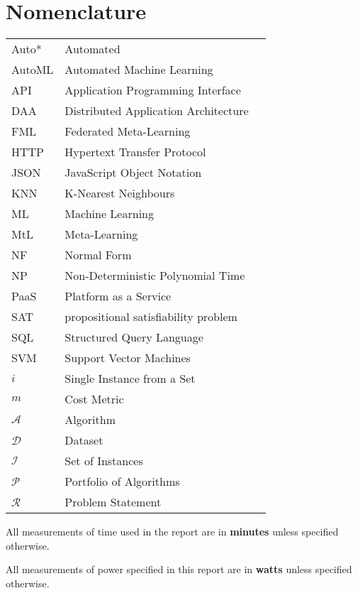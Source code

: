 \section*{\Huge{Nomenclature}}
\begin{tabular}{lp{9cm}l}
Auto*&Automated\\
AutoML&Automated Machine Learning\\
API&Application Programming Interface\\
DAA&Distributed Application Architecture\\
FML&Federated Meta-Learning\\
HTTP&Hypertext Transfer Protocol\\
JSON&JavaScript Object Notation\\
KNN&K-Nearest Neighbours\\
ML&Machine Learning\\
MtL&Meta-Learning\\
NF&Normal Form\\
NP& Non-Deterministic Polynomial Time\\
PaaS&Platform as a Service\\
SAT&propositional satisfiability problem\\
SQL&Structured Query Language\\
SVM&Support Vector Machines\\

${\displaystyle{i}}$&Single Instance from a Set\\
${\displaystyle{m}}$&Cost Metric\\
${\displaystyle{\mathcal{A}}}$&Algorithm\\
${\displaystyle{\mathcal{D}}}$&Dataset\\
${\displaystyle{\mathcal{I}}}$&Set of Instances\\
${\displaystyle{\mathcal{P}}}$&Portfolio of Algorithms\\
${\displaystyle{\mathcal{R}}}$&Problem Statement

\end{tabular}
\vspace{2cm}

All measurements of time used in the report are in \textbf{minutes} unless specified otherwise.

All measurements of power specified in this report are in \textbf{watts} unless specified otherwise.
